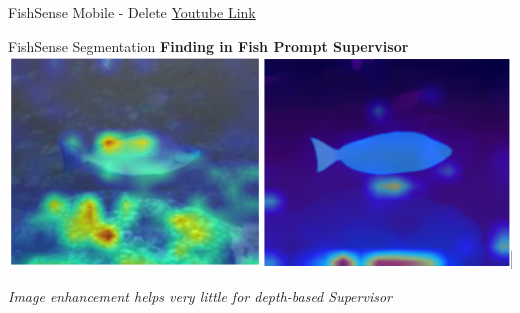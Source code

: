 \begin{frame}{FishSense Mobile - Delete}
    \centering
    \href{https://www.youtube.com/shorts/Q-dP97_H-QA}{Youtube Link}
\end{frame}


\begin{frame}{FishSense Segmentation}
    \centering
    \textbf{Finding in Fish Prompt Supervisor}
    \vspace{0.3cm} %
    \includegraphics[width=\textwidth]{images/fs_depth_3.png}
    \vspace{0.3cm} %

    \textit{Image enhancement helps very little for depth-based Supervisor}
\end{frame}


